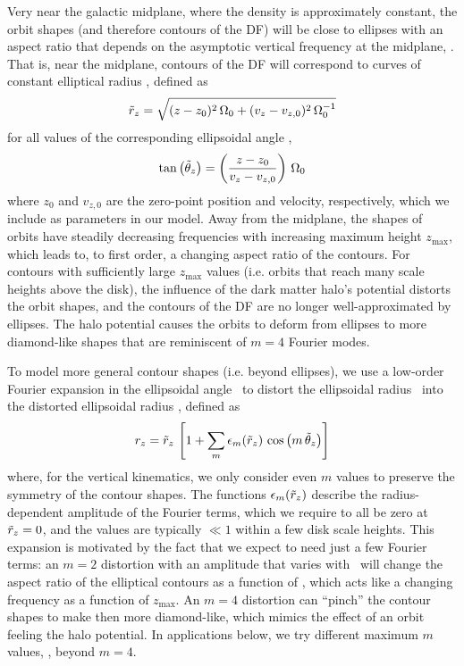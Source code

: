Very near the galactic midplane, where the density is approximately constant, the orbit
shapes (and therefore contours of the DF) will be close to ellipses with an aspect ratio
that depends on the asymptotic vertical frequency at the midplane, \freqzero.
That is, near the midplane, contours of the DF will correspond to curves of constant
elliptical radius \rzp, defined as
\begin{equation}
    \tilde{r}_z = \sqrt{(z-z_0)^2 \, \Omega_0 + (v_z-v_{z,0})^2 \, \Omega_0^{-1}} \label{eq:rzp}
\end{equation}
for all values of the corresponding ellipsoidal angle \thzp,
\begin{equation}
    \tan \left(\tilde{\theta}_z\right) = \left(\frac{z-z_0}{v_z-v_{z,0}}\right) \, \Omega_0
    \label{eq:thetazp}
\end{equation}
where $z_0$ and $v_{z,0}$ are the zero-point position and velocity, respectively, which
we include as parameters in our model.
Away from the midplane, the shapes of orbits have steadily decreasing frequencies with
increasing maximum height $z_{\textrm{max}}$, which leads to, to first order, a changing
aspect ratio of the contours.
For contours with sufficiently large $z_{\textrm{max}}$ values (i.e. orbits that reach
many scale heights above the disk), the influence of the dark matter halo's potential
distorts the orbit shapes, and the contours of the DF are no longer well-approximated by
ellipses.
The halo potential causes the orbits to deform from ellipses to more diamond-like shapes
that are reminiscent of $m=4$ Fourier modes.

To model more general contour shapes (i.e. beyond ellipses), we use a low-order Fourier
expansion in the ellipsoidal angle \thzp\ to distort the ellipsoidal radius \rzp\
into the distorted ellipsoidal radius \rz, defined as
\begin{equation}
    r_z = \tilde{r}_z \, \left[1 + \sum_m \epsilon_m(\tilde{r}_z) \, \cos{\left(m\,\ensuremath{\tilde{\theta}_z}\right)}\right] \label{eq:rz}
\end{equation}
where, for the vertical kinematics, we only consider even $m$ values to preserve the
symmetry of the contour shapes.
The functions $\epsilon_m(\tilde{r}_z)$ describe the radius-dependent amplitude of the Fourier
terms, which we require to all be zero at $\tilde{r}_z=0$, and the values are typically $\ll
1$ within a few disk scale heights.
This expansion is motivated by the fact that we expect to need just a few Fourier terms:
an $m=2$ distortion with an amplitude that varies with \rzp\ will change the aspect
ratio of the elliptical contours as a function of \rzp, which acts like a changing
frequency as a function of $z_{\textrm{max}}$.
An $m=4$ distortion can ``pinch'' the contour shapes to make then more diamond-like,
which mimics the effect of an orbit feeling the halo potential.
In applications below, we try different maximum $m$ values, \mmax, beyond
$m=4$.

